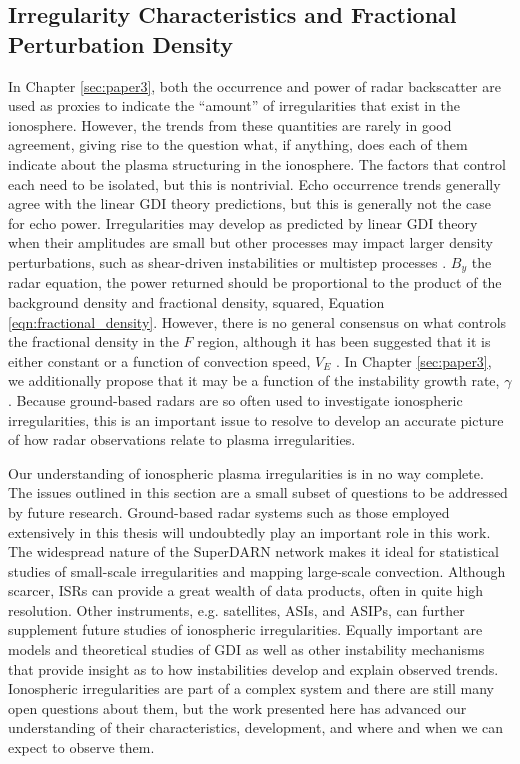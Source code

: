 \subsection{Irregularity Characteristics and Fractional Perturbation Density}
\label{sec:fw_fracdens}
In Chapter \ref{sec:paper3}, both the occurrence and power of radar backscatter are used as proxies to indicate the ``amount'' of irregularities that exist in the ionosphere.  However, the trends from these quantities are rarely in good agreement, giving rise to the question what, if anything, does each of them indicate about the plasma structuring in the ionosphere.  The factors that control each need to be isolated, but this is nontrivial.  Echo occurrence trends generally agree with the linear GDI theory predictions, but this is generally not the case for echo power.  Irregularities may develop as predicted by linear GDI theory when their amplitudes are small but other processes may impact larger density perturbations, such as shear-driven instabilities \citep{Gondarenko2006} or multistep processes \citep{Carlson2012}.  \(B_y\) the radar equation, the power returned should be proportional to the product of the background density and fractional density, squared, Equation \ref{eqn:fractional_density}.  However, there is no general consensus on what controls the fractional density in the \(F\) region, although it has been suggested that it is either constant or a function of convection speed, \(V_E\) \citep{Kustov1988,Haldoupis1990,Makarevich2014b}.  In Chapter \ref{sec:paper3}, we additionally propose that it may be a function of the instability growth rate, \(\gamma\).  Because ground-based radars are so often used to investigate ionospheric irregularities, this is an important issue to resolve to develop an accurate picture of how radar observations relate to plasma irregularities.

Our understanding of ionospheric plasma irregularities is in no way complete.  The issues outlined in this section are a small subset of questions to be addressed by future research.  Ground-based radar systems such as those employed extensively in this thesis will undoubtedly play an important role in this work.  The widespread nature of the SuperDARN network makes it ideal for statistical studies of small-scale irregularities and mapping large-scale convection.  Although scarcer, ISRs can provide a great wealth of data products, often in quite high resolution.  Other instruments, e.g. satellites, ASIs, and ASIPs, can further supplement future studies of ionospheric irregularities.  Equally important are models and theoretical studies of GDI as well as other instability mechanisms that provide insight as to how instabilities develop and explain observed trends.  Ionospheric irregularities are part of a complex system and there are still many open questions about them, but the work presented here has advanced our understanding of their characteristics, development, and where and when we can expect to observe them.



